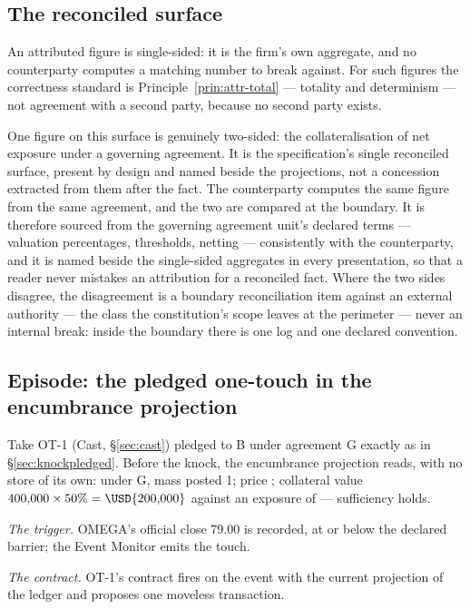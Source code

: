 \subsection{The reconciled surface}

An attributed figure is single-sided: it is the firm's own aggregate, and no
counterparty computes a matching number to break against. For such figures the
correctness standard is Principle~\ref{prin:attr-total} --- totality and
determinism --- not agreement with a second party, because no second party
exists.

One figure on this surface is genuinely two-sided: the collateralisation of net
exposure under a governing agreement. It is the specification's single reconciled
surface, present by design and named beside the projections, not a concession
extracted from them after the fact. The counterparty computes the same figure
from the same agreement, and the two are compared at the boundary. It is
therefore sourced from the governing agreement unit's declared terms ---
valuation percentages, thresholds, netting --- consistently with the
counterparty, and it is named beside the single-sided aggregates in every
presentation, so that a reader never mistakes an attribution for a reconciled
fact. Where the two sides disagree, the disagreement is a boundary
reconciliation item against an external authority --- the class the
constitution's scope leaves at the perimeter --- never an internal break: inside
the boundary there is one log and one declared convention.

\subsection{Episode: the pledged one-touch in the encumbrance projection}

Take OT-1 (Cast, \S\ref{sec:cast}) pledged to B under agreement G exactly as in
\S\ref{sec:knockpledged}. Before the knock, the encumbrance projection reads, with no
store of its own: under G, mass posted 1; price ; collateral value
$400{,}000 \times 50\% = \USD{200{,}000}$ against an exposure of
 --- sufficiency holds.

\emph{The trigger.} OMEGA's official close 79.00 is recorded, at or below the
declared barrier; the Event Monitor emits the touch.

\emph{The contract.} OT-1's contract fires on the event with the current
projection of the ledger and proposes one moveless transaction.

